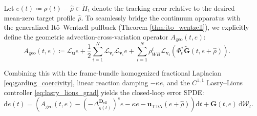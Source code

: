 \documentclass[11pt,a4paper,reqno]{article}
\theoremstyle{definition}
\theoremstyle{remark}
\begin{document}
Let $e(t) \coloneqq \rho(t) - \hat{\rho} \in \dot{H}_t$ denote the tracking error relative to the desired mean-zero target profile $\hat{\rho}$. To seamlessly bridge the continuum apparatus with the generalized It\^o--Wentzell pullback (Theorem \ref{thm:ito_wentzell}), we explicitly define the geometric advection-cross-variation operator $A_{\mathrm{geo}}(t, e)$:
\begin{equation}\label{eq:ageo_def}
  A_{\mathrm{geo}}(t, e) \coloneqq \mathcal{L}_{\mathbf{u}} e + \frac{1}{2} \sum_{i=1}^N \mathcal{L}_{\mathbf{v}_i} \mathcal{L}_{\mathbf{v}_i} e + \sum_{i=1}^N \rho_{WB}^i \mathcal{L}_{\mathbf{v}_i} \left( \Phi_t^* \tilde{\mathbf{G}}(t, e + \hat{\rho}) \right).
\end{equation}

Combining this with the frame-bundle homogenized fractional Laplacian \eqref{eq:garding_coercivity}, linear reaction damping $-\kappa e$, and the $C^{1,1}$ Lasry--Lions controller \eqref{eq:lasry_lions_grad} yields the closed-loop error SPDE:
\begin{equation}\label{eq:closed_loop_spde}
  \mathrm{d}e(t) = \left( A_{\mathrm{geo}}(t, e) - (-\Delta_{g(t)}^{\mathbf{D}_{\mathrm{eff}}})^s e - \kappa e - \mathbf{u}_{\mathrm{TDA}}(e + \hat{\rho}) \right)\mathrm{d}t + \mathbf{G}(t, e)\,\mathrm{d}\mathcal{W}_t.
\end{equation}
\end{document}
